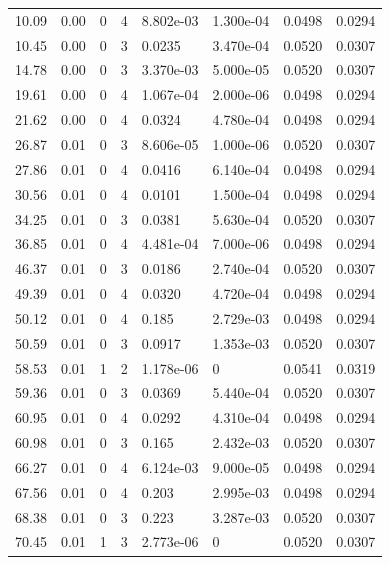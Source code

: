 \documentclass[preview]{standalone}
\begin{document}
{{\begin{tabular}{L{1.2cm}C{1.2cm} C{0.3cm}C{0.5cm} C{1.4cm}C{1.4cm} C{1.4cm}C{1.4cm}}
  10.09  &  0.00  & 0     &  4 &  8.802e-03  & 1.300e-04  & 0.0498 &  0.0294   \\ 
  10.45  &  0.00  & 0     &  3 &  0.0235  & 3.470e-04  & 0.0520 &  0.0307   \\ 
  14.78  &  0.00  & 0     &  3 &  3.370e-03  & 5.000e-05  & 0.0520 &  0.0307   \\ 
  19.61  &  0.00  & 0     &  4 &  1.067e-04  & 2.000e-06  & 0.0498 &  0.0294   \\ 
  21.62  &  0.00  & 0     &  4 &  0.0324  & 4.780e-04  & 0.0498 &  0.0294   \\ 
  26.87  &  0.01  & 0     &  3 &  8.606e-05  & 1.000e-06  & 0.0520 &  0.0307   \\ 
  27.86  &  0.01  & 0     &  4 &  0.0416  & 6.140e-04  & 0.0498 &  0.0294   \\ 
  30.56  &  0.01  & 0     &  4 &  0.0101  & 1.500e-04  & 0.0498 &  0.0294   \\ 
  34.25  &  0.01  & 0     &  3 &  0.0381  & 5.630e-04  & 0.0520 &  0.0307   \\ 
  36.85  &  0.01  & 0     &  4 &  4.481e-04  & 7.000e-06  & 0.0498 &  0.0294   \\ 
  46.37  &  0.01  & 0     &  3 &  0.0186  & 2.740e-04  & 0.0520 &  0.0307   \\ 
  49.39  &  0.01  & 0     &  4 &  0.0320  & 4.720e-04  & 0.0498 &  0.0294   \\ 
  50.12  &  0.01  & 0     &  4 &  0.185  & 2.729e-03  & 0.0498 &  0.0294   \\ 
  50.59  &  0.01  & 0     &  3 &  0.0917  & 1.353e-03  & 0.0520 &  0.0307   \\ 
  58.53  &  0.01  & 1     &  2 &  1.178e-06  & 0  & 0.0541 &  0.0319   \\ 
  59.36  &  0.01  & 0     &  3 &  0.0369  & 5.440e-04  & 0.0520 &  0.0307   \\ 
  60.95  &  0.01  & 0     &  4 &  0.0292  & 4.310e-04  & 0.0498 &  0.0294   \\ 
  60.98  &  0.01  & 0     &  3 &  0.165  & 2.432e-03  & 0.0520 &  0.0307   \\ 
  66.27  &  0.01  & 0     &  4 &  6.124e-03  & 9.000e-05  & 0.0498 &  0.0294   \\ 
  67.56  &  0.01  & 0     &  4 &  0.203  & 2.995e-03  & 0.0498 &  0.0294   \\ 
  68.38  &  0.01  & 0     &  3 &  0.223  & 3.287e-03  & 0.0520 &  0.0307   \\ 
  70.45  &  0.01  & 1     &  3 &  2.773e-06  & 0  & 0.0520 &  0.0307   \\ 

\end{tabular}}}
\end{document}
